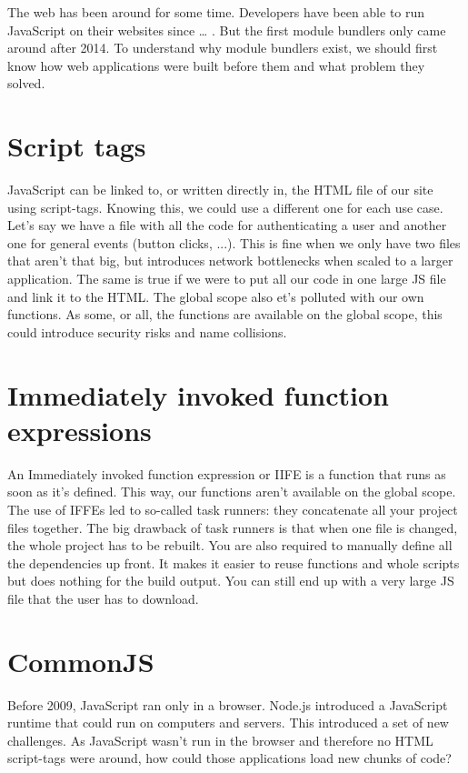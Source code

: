 The web has been around for some time. Developers have been able to run JavaScript on their websites since … . But the first module bundlers only came around after 2014. To understand why module bundlers exist, we should first know how web applications were built before them and what problem they solved.

\section{Script tags}
JavaScript can be linked to, or written directly in, the HTML file of our site using script-tags. Knowing this, we could use a different one for each use case. Let’s say we have a file with all the code for authenticating a user and another one for general events (button clicks, ...). This is fine when we only have two files that aren’t that big, but introduces network bottlenecks when scaled to a larger application. The same is true if we were to put all our code in one large JS file and link it to the HTML. The global scope also et’s polluted with our own functions. As some, or all, the functions are available on the global scope, this could introduce security risks and name collisions. 

\section{Immediately invoked function expressions}
An Immediately invoked function expression or IIFE is a function that runs as soon as it’s defined. This way, our functions aren’t available on the global scope. The use of IFFEs led to so-called task runners: they concatenate all your project files together. The big drawback of task runners is that when one file is changed, the whole project has to be rebuilt. You are also required to manually define all the dependencies up front. It makes it easier to reuse functions and whole scripts but does nothing for the build output. You can still end up with a very large JS file that the user has to download. 

\section{CommonJS}
Before 2009, JavaScript ran only in a browser. Node.js introduced a JavaScript runtime that could run on computers and servers. This introduced a set of new challenges. As JavaScript wasn’t run in the browser and therefore no HTML script-tags were around, how could those applications load new chunks of code? 

